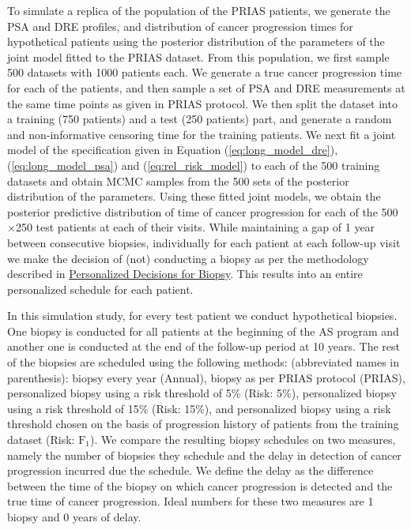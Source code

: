 To simulate a replica of the population of the PRIAS patients, we generate the PSA and DRE profiles, and distribution of cancer progression times for hypothetical patients using the posterior distribution of the parameters of the joint model fitted to the PRIAS dataset. From this population, we first sample 500 datasets with 1000 patients each. We generate a true cancer progression time for each of the patients, and then sample a set of PSA and DRE measurements at the same time points as given in PRIAS protocol. We then split the dataset into a training (750 patients) and a test (250 patients) part, and generate a random and non‐informative censoring time for the training patients. We next fit a joint model of the specification given in Equation (\ref{eq:long_model_dre}), (\ref{eq:long_model_psa}) and (\ref{eq:rel_risk_model}) to each of the 500 training datasets and obtain MCMC samples from the 500 sets of the posterior distribution of the parameters. Using these fitted joint models, we obtain the posterior predictive distribution of time of cancer progression for each of the 500$\times$250 test patients at each of their visits. While maintaining a gap of 1 year between consecutive biopsies, individually for each patient at each follow-up visit we make the decision of (not) conducting a biopsy as per the methodology described in \hyperref[subsec:pers_decision_making]{Personalized Decisions for Biopsy}. This results into an entire personalized schedule for each patient.

In this simulation study, for every test patient we conduct hypothetical biopsies. One biopsy is conducted for all patients at the beginning of the AS program and another one is conducted at the end of the follow-up period at 10 years. The rest of the biopsies are scheduled using the following methods: (abbreviated names in parenthesis): biopsy every year (Annual), biopsy as per PRIAS protocol (PRIAS), personalized biopsy using a risk threshold of 5\% (Risk: 5\%), personalized biopsy using a risk threshold of 15\% (Risk: 15\%), and personalized biopsy using a risk threshold chosen on the basis of progression history of patients from the training dataset (Risk: $\mbox{F}_1$). We compare the resulting biopsy schedules on two measures, namely the number of biopsies they schedule and the delay in detection of cancer progression incurred due the schedule. We define the delay as the difference between the time of the biopsy on which cancer progression is detected and the true time of cancer progression. Ideal numbers for these two measures are 1 biopsy and 0 years of delay.